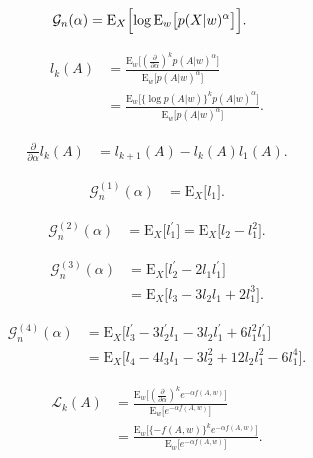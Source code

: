 \documentclass[11pt,a4paper]{jsarticle}
\newcommand{\E}{\mathrm{E}}
\begin{document}
\begin{align}
\mathcal{G}_n (\alpha)
& =
\E_X \Bigl[ \log \E_w \bigl[ p (X | w)^{\alpha} \bigr] \Bigr]. \nonumber
\end{align}

\begin{align}
l_k (A)
& =
\frac{\E_w \bigl[ (\frac{\partial}{\partial \alpha})^k p (A | w)^{\alpha} \bigr]}{\E_w \bigl[ p (A | w)^{\alpha} \bigr]} \nonumber \\
& =
\frac{\E_w \bigl[ \{ \log p (A | w) \}^k p (A | w)^{\alpha} \bigr]}{\E_w \bigl[ p (A | w)^{\alpha} \bigr]}. \nonumber
\end{align}

\begin{align}
\frac{\partial}{\partial \alpha}l_k (A)
& =
l_{k+1} (A) - l_k (A) l_1 (A). \nonumber
\end{align}

\begin{align}
\mathcal{G}_n^{(1)} (\alpha)
& =
\E_X \bigl[ l_1 \bigr]. \nonumber
\end{align}

\begin{align}
\mathcal{G}_n^{(2)} (\alpha)
& =
\E_X \bigl[ l^{\prime}_1 \bigr] = \E_X \bigl[ l_2 - l_1^2 \bigr]. \nonumber
\end{align}

\begin{align}
\mathcal{G}_n^{(3)} (\alpha)
& =
\E_X \bigl[ l^{\prime}_2 - 2 l_1 l^{\prime}_1 \bigr] \nonumber \\
& =
\E_X \bigl[ l_3 - 3 l_2 l_1 + 2 l_1^3 \bigr]. \nonumber
\end{align}

\begin{align}
\mathcal{G}_n^{(4)} (\alpha)
& =
\E_X \bigl[ l^{\prime}_3 - 3 l^{\prime}_2 l_1 - 3 l_2 l^{\prime}_1 + 6 l_1^2 l^{\prime}_1 \bigr] \nonumber \\
& =
\E_X \bigl[ l_4 - 4 l_3 l_1 - 3 l_2^2 + 12 l_2 l_1^2 - 6 l_1^4 \bigr]. \nonumber
\end{align}

\begin{align}
\mathcal{L}_k (A)
& =
\frac{\E_w \bigl[ (\frac{\partial}{\partial \alpha})^k e^{- \alpha f (A, w)} \bigr]}{\E_w \bigl[ e^{- \alpha f (A, w)} \bigr]} \nonumber \\
& =
\frac{\E_w \bigl[ \{ -f (A, w) \}^k e^{- \alpha f (A, w)} \bigr]}{\E_w \bigl[ e^{- \alpha f (A, w)} \bigr]}. \nonumber
\end{align}
\end{document}
